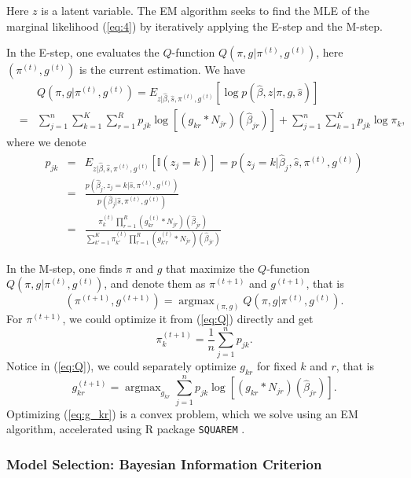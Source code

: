 \documentclass[11pt]{article}
\DeclareMathOperator*{\argmax}{argmax}
\begin{document}
Here $z$ is a latent variable. The EM algorithm seeks to find the MLE of the marginal likelihood (\ref{eq:4}) by iteratively applying the E-step and the M-step.

In the E-step, one evaluates the $Q$-function $Q(\pi,g|\pi^{(t)},g^{(t)})$, here $(\pi^{(t)},g^{(t)})$ is the current estimation. We have
\begin{eqnarray}
    &&Q(\pi,g|\pi^{(t)},g^{(t)}) = E_{z|\hat\beta,\hat s,\pi^{(t)},g^{(t)}}\left[\log p(\hat\beta,z|\pi,g,\hat s)\right]\nonumber\\
    &=&\sum_{j=1}^n\sum_{k=1}^K\sum_{r=1}^Rp_{jk}\log \left[(g_{kr}*N_{jr})(\hat\beta_{jr}) \right]+\sum_{j=1}^n\sum_{k=1}^Kp_{jk}\log\pi_k,
\label{eq:Q}
\end{eqnarray}
where we denote
\begin{eqnarray}
    p_{jk}&=&E_{z|\hat\beta,\hat s,\pi^{(t)},g^{(t)}}[\mathbb{I}(z_j=k)]=p(z_j=k|\hat\beta_j,\hat s,\pi^{(t)},g^{(t)})\nonumber\\
    &=& \frac{p(\hat\beta_j,z_j=k|\hat s,\pi^{(t)},g^{(t)})}{p(\hat\beta_j|\hat s,\pi^{(t)},g^{(t)})}\nonumber\\
    &=& \frac{\pi_k^{(t)}\prod_{r=1}^R(g_{kr}^{(t)}*N_{jr})(\hat\beta_{jr})}{\sum_{k'=1}^K\pi_{k'}^{(t)}\prod_{r=1}^R(g_{k'r}^{(t)}*N_{jr})(\hat\beta_{jr})}
\end{eqnarray}

In the M-step, one finds $\pi$ and $g$ that maximize the $Q$-function $Q(\pi,g|\pi^{(t)},g^{(t)})$, and denote them as $\pi^{(t+1)}$ and $g^{(t+1)}$, that is 
\begin{equation}
(\pi^{(t+1)}, g^ {(t+1)}) =\argmax_{(\pi,g)} Q(\pi,g|\pi^{(t)},g^{(t)}).
\end{equation}
For $\pi^{(t+1)}$, we could optimize it from (\ref{eq:Q}) directly and get
\begin{equation}
    \pi_k^{(t+1)} = \frac{1}{n} \sum_{j=1}^n p_{jk}.
\end{equation}
Notice in (\ref{eq:Q}), we could separately optimize $g_{kr}$ for fixed $k$ and $r$, that is 
\begin{equation}
    g_{kr}^ {(t+1)}=\argmax_{g_{kr}}\sum_{j=1}^np_{jk}\log \left[(g_{kr}*N_{jr})(\hat\beta_{jr}) \right].
\label{eq:g_kr}
\end{equation}
Optimizing (\ref{eq:g_kr}) is a convex problem, which we solve using an EM algorithm, accelerated using R package {\tt SQUAREM} .

\subsubsection{Model Selection: Bayesian Information Criterion}
\end{document}

